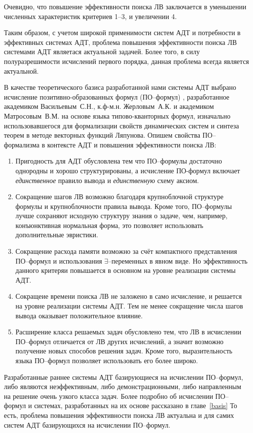 Очевидно, что повышение эффективности поиска ЛВ заключается в уменьшении численных характеристик критериев 1--3, и увеличении 4.

Таким образом, с учетом широкой применимости систем АДТ и потребности в эффективных системах АДТ, проблема повышения эффективности поиска ЛВ системами АДТ являетася актуальной задачей. Более того, в силу полуразрешимости исчислений первого порядка, данная проблема всегда является актуальной.


В качестве теоретического базиса разработанной нами системы АДТ выбрано исчисление позитивно-образованных формул (ПО--формул) \cite{ICDS2000, Vas1995}, разработанное академиком Васильевым~С.Н., к.ф-м.н. Жерловым~А.К. и академиком Матросовым~В.М. на основе языка типово-кванторных формул, изначально использовавшегося для формализации свойств динамических систем и синтеза теорем в методе векторных функций Ляпунова. Опишем свойства ПО--формализма в контексте АДТ и повышения эффективности поиска ЛВ:
\begin{enumerate}
\item {Пригодность для АДТ} обусловлена тем что ПО--формулы достаточно однородны и хорошо структурированы, а исчисление ПО-формул включает \emph{единственное} правило вывода и \emph{единственную} схему аксиом.
\item {Сокращение шагов ЛВ} возможно благодаря крупноблочной структуре формулы и крупноблочности правила вывода. Кроме того, ПО--формулы лучше сохраняют исходную структуру знания о задаче, чем, например, конъюнктивная нормальная форма, это позволяет использовать дополнительные эвристики.
\item {Сокращение расхода памяти} возможно за счёт компактного представления ПО--формул и использования $\exists$--переменных в явном виде. Но эффективность данного критеряи повышается в основном на уровне реализации системы АДТ.
\item {Сокращеие времени поиска ЛВ} не заложено в само исчисление, и решается на уровне реализации системы АДТ. Тем не менее сокращение числа шагов вывода оказывает положительное влияние.
\item {Расширение класса решаемых задач} обусловлено тем, что ЛВ в исчислении ПО--формул отличается от ЛВ других исчислений, а значит возможно получение новых способов решения задач. Кроме того, выразительность языка ПО--формул позволяет использовать его более широко.
\end{enumerate}

Разработанные раннее системы АДТ базирующиеся на исчислении ПО--формул, либо являются неэффективным, либо демонстрационными, либо направленным на решение очень узкого класса задач. Более подробно об исчислении ПО--формул и системах, разработанных на их основе рассказано в главе~\ref{basis} То есть, проблема повышения эффективности поиска ЛВ актуальна и для самих систем АДТ базирующихся на исчислении ПО--формул.

